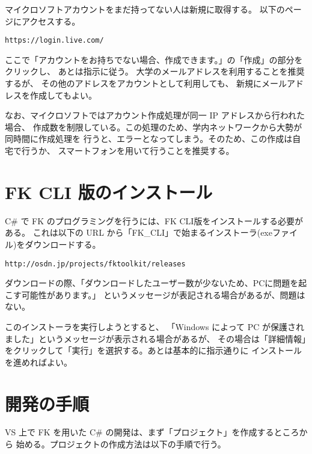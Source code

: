 \documentclass[a4paper]{jsarticle}
\begin{document}
マイクロソフトアカウントをまだ持ってない人は新規に取得する。
以下のページにアクセスする。
\begin{screen}
\begin{center}
	\verb+https://login.live.com/+
\end{center}
\end{screen}
ここで「アカウントをお持ちでない場合、作成できます。」の「作成」の部分をクリックし、
あとは指示に従う。
大学のメールアドレスを利用することを推奨するが、
その他のアドレスをアカウントとして利用しても、
新規にメールアドレスを作成してもよい。

なお、マイクロソフトではアカウント作成処理が同一 IP アドレスから行われた場合、
作成数を制限している。この処理のため、学内ネットワークから大勢が同時間に作成処理を
行うと、エラーとなってしまう。そのため、この作成は自宅で行うか、
スマートフォンを用いて行うことを推奨する。

\section{FK CLI 版のインストール}

C\# で FK のプログラミングを行うには、FK CLI版をインストールする必要がある。
これは以下の URL から「FK\_CLI」で始まるインストーラ(exeファイル)をダウンロードする。

\begin{screen}
\begin{center}
	\verb+http://osdn.jp/projects/fktoolkit/releases+
\end{center}
\end{screen}
ダウンロードの際、「ダウンロードしたユーザー数が少ないため、PCに問題を起こす可能性があります。」
というメッセージが表記される場合があるが、問題はない。

このインストーラを実行しようとすると、
「Windows によって PC が保護されました」というメッセージが表示される場合があるが、
その場合は「詳細情報」をクリックして「実行」を選択する。あとは基本的に指示通りに
インストールを進めればよい。

\section{開発の手順}

VS 上で FK を用いた C\# の開発は、まず「プロジェクト」を作成するところから
始める。プロジェクトの作成方法は以下の手順で行う。
\end{document}
